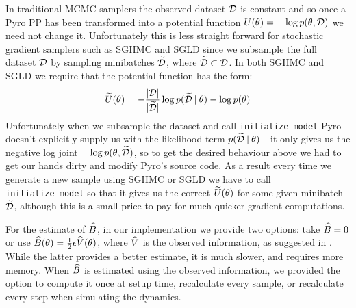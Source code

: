 In traditional MCMC samplers the observed dataset $\mathcal{D}$ is constant and so once a Pyro PP has been transformed into a potential function $U(\theta) = - \log p(\theta, \mathcal{D})$ we need not change it. Unfortunately this is less straight forward for stochastic gradient samplers such as SGHMC and SGLD since we subsample the full dataset $\mathcal{D}$ by sampling minibatches $\widetilde{\mathcal{D}}$, where $\widetilde{\mathcal{D}} \subset \mathcal{D}$. In both SGHMC and SGLD we require that the potential function has the form:
$$\widetilde{U}(\theta) =  -\frac{|\mathcal{D}|}{|\widetilde{\mathcal{D}}|} \log p(\widetilde{\mathcal{D}} \: | \: \theta) - \log p (\theta)$$
Unfortunately when we subsample the dataset and call \texttt{initialize\_model} Pyro doesn't explicitly supply us with the likelihood term $p(\widetilde{\mathcal{D}} \: | \: \theta)$ - it only gives us the negative log joint $- \log p(\theta, \widetilde{\mathcal{D}})$, so to get the desired behaviour above we had to get our hands dirty and modify Pyro's source code. As a result every time we generate a new sample using SGHMC or SGLD we have to call \texttt{initialize\_model} so that it gives us the correct $\widetilde{U}(\theta)$ for some given minibatch $\widetilde{\mathcal{D}}$, although this is a small price to pay for much quicker gradient computations.

For the estimate of $\widehat B$, in our implementation we provide two options: take $\widehat B = 0$ or use $\widehat B(\theta) = \frac 1 2 \epsilon \widehat V(\theta)$, where $\widehat V$ is the observed information, as suggested in \cite{sghmc}. While the latter provides a better estimate, it is much slower, and requires more memory. When $\widehat B$ is estimated using the observed information, we provided the option to compute it once at setup time, recalculate every sample, or recalculate every step when simulating the dynamics.